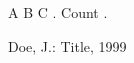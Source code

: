 \documentclass{article}
\begin{document}
A \cite{k} B \cite{k} C \cite{k}. Count .
\begin{thebibliography}{}
 Doe, J.: Title, 1999
\end{thebibliography}
\end{document}
